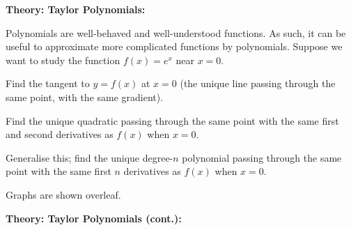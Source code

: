 \documentclass{article}
\begin{document}
\clearpage



\textbf{Theory: Taylor Polynomials:}

\vspace{5mm}

Polynomials are well-behaved and well-understood functions. As such, it can be useful to approximate more complicated functions by polynomials. Suppose we want to study the function $f(x)=e^x$ near $x=0$.\bigskip

Find the tangent to $y=f(x)$ at $x=0$ (the unique line passing through the same point, with the same gradient).

\vfill


Find the unique quadratic passing through the same point with the same first and second derivatives as $f(x)$ when $x=0$.


\vfill


Generalise this; find the unique degree-$n$ polynomial passing through the same point with the same first $n$ derivatives as $f(x)$ when $x=0$.

\vfill


Graphs are shown overleaf.


\clearpage






\textbf{Theory: Taylor Polynomials (cont.):}

\vspace{5mm}
\end{document}
